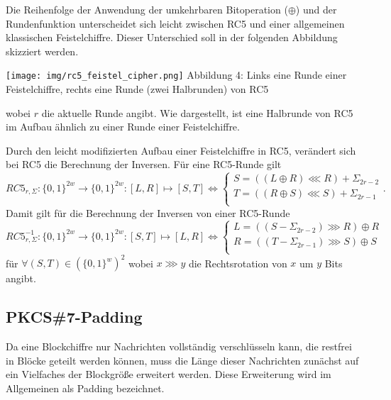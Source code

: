 \documentclass[course=erap]{aspdoc}
\begin{document}
Die Reihenfolge der Anwendung der umkehrbaren Bitoperation ($\oplus$) und der Rundenfunktion unterscheidet sich leicht zwischen RC5 und einer allgemeinen klassischen Feistelchiffre. Dieser Unterschied soll in der folgenden Abbildung skizziert werden.

\begin{samepage}
\begin{center}
    \texttt{[image: img/rc5\_feistel\_cipher.png]}\break
    Abbildung 4: Links eine Runde einer Feistelchiffre, rechts eine Runde (zwei Halbrunden) von RC5
\end{center}
\end{samepage}

wobei $r$ die aktuelle Runde angibt. Wie dargestellt, ist eine Halbrunde von RC5 im Aufbau ähnlich zu einer Runde einer Feistelchiffre.\bigbreak

Durch den leicht modifizierten Aufbau einer Feistelchiffre in RC5, verändert sich bei RC5 die Berechnung der Inversen. Für eine RC5-Runde gilt
\[
    RC5_{r, \Sigma} \colon \{0, 1\}^{2w} \to \{0, 1\}^{2w} \colon [L, R] \mapsto [S, T] \Leftrightarrow
        \begin{cases}
            S = ((L \oplus R) \lll R) + \Sigma_{2r-2} \\
            T = ((R \oplus S) \lll S) + \Sigma_{2r-1} \\
        \end{cases}.
\]
Damit gilt für die Berechnung der Inversen von einer RC5-Runde
\[
    RC5_{r, \Sigma}^{-1} \colon \{0, 1\}^{2w} \to \{0, 1\}^{2w} \colon [S, T] \mapsto [L, R] \Leftrightarrow
        \begin{cases}
            L = ((S - \Sigma_{2r-2}) \ggg R) \oplus R \\
            R = ((T - \Sigma_{2r-1}) \ggg S) \oplus S \\
        \end{cases}
\]
für $\forall(S, T) \in (\{0, 1\}^w)^2$ wobei $x \ggg y$ die Rechtsrotation von $x$ um $y$ Bits angibt.

\subsection{PKCS\#7-Padding}

Da eine Blockchiffre nur Nachrichten vollständig verschlüsseln kann, die restfrei in Blöcke geteilt werden können, muss die Länge dieser Nachrichten zunächst auf ein Vielfaches der Blockgröße erweitert werden. Diese Erweiterung wird im Allgemeinen als Padding bezeichnet.\bigbreak
\end{document}
